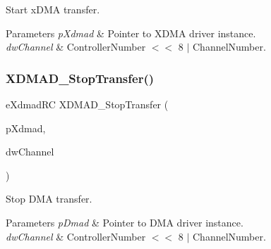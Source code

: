 Start x\+D\+MA transfer. 


\begin{DoxyParams}{Parameters}
{\em p\+Xdmad} & Pointer to X\+D\+MA driver instance. \\
\hline
{\em dw\+Channel} & Controller\+Number $<$$<$ 8 $\vert$ Channel\+Number. \\
\hline
\end{DoxyParams}
\mbox{\label{group__dmad__functions_ga6be5cec75618250adb227d7588ae7078}} 
\subsubsection{\texorpdfstring{XDMAD\_StopTransfer()}{XDMAD\_StopTransfer()}}
{\footnotesize\ttfamily e\+Xdmad\+RC X\+D\+M\+A\+D\+\_\+\+Stop\+Transfer (\begin{DoxyParamCaption}\item[{\mbox{\hyperlink{group__dmad__structs_gaf2c13151514615a6beb35c0d868a5053}{s\+Xdmad}} $\ast$}]{p\+Xdmad,  }\item[{uint32\+\_\+t}]{dw\+Channel }\end{DoxyParamCaption})}



Stop D\+MA transfer. 


\begin{DoxyParams}{Parameters}
{\em p\+Dmad} & Pointer to D\+MA driver instance. \\
\hline
{\em dw\+Channel} & Controller\+Number $<$$<$ 8 $\vert$ Channel\+Number. \\
\hline
\end{DoxyParams}
